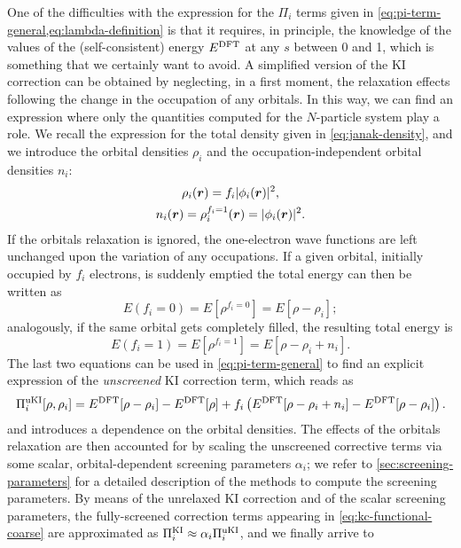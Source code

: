 One of the difficulties with the expression for the $\Pi_i$ terms given in \cref{eq:pi-term-general,eq:lambda-definition} is that it requires, in principle, the knowledge of the values of the (self-consistent) energy $E^{\rm DFT}$ at any $s$ between 0 and 1, which is something that we certainly want to avoid. A simplified version of the KI correction can be obtained by neglecting, in a first moment, the relaxation effects following the change in the occupation of any orbitals. In this way, we can find an expression where only the quantities computed for the $N$-particle system play a role. We recall the expression for the total density given in \cref{eq:janak-density}, and we introduce the orbital densities $\rho_i$ and the occupation-independent orbital densities $n_i$:
%
\begin{equation}
    \begin{gathered}
    \rho_i({\bm r}) = f_i |\phi_i({\bm r})|^2 , \\
    n_i({\bm r}) = \rho_i^{f_i=1}({\bm r}) = |\phi_i({\bm r})|^2 .
    \end{gathered}
    \label{eq:orbital-densities}
\end{equation}
%
If the orbitals relaxation is ignored, the one-electron wave functions are left unchanged upon the variation of any occupations. If a given orbital, initially occupied by $f_i$ electrons, is suddenly emptied the total energy can then be written as
%
\begin{equation}
    E(f_i=0) = E[\rho^{f_i=0}] = E[\rho-\rho_i] ;
    \label{eq:unrelaxed-energy-emptied-orbital}
\end{equation}
%
analogously, if the same orbital gets completely filled, the resulting total energy is
%
\begin{equation}
    E(f_i=1) = E[\rho^{f_i=1}] = E[\rho-\rho_i+n_i] .
    \label{eq:unrelaxed-energy-filled-orbital}
\end{equation}
%
The last two equations can be used in \cref{eq:pi-term-general} to find an explicit expression of the \emph{unscreened} KI correction term, which reads as
%
\begin{equation}
    \Pi_i^{\rm uKI}[\rho,\rho_i] = E^{\rm DFT}[\rho - \rho_i] - E^{\rm DFT}[\rho] + f_i \left( E^{\rm DFT}[\rho - \rho_i + n_i] - E^{\rm DFT}[\rho - \rho_i] \right) .
    \label{eq:ki-correction}
\end{equation}
%
and introduces a dependence on the orbital densities. The effects of the orbitals relaxation are then accounted for by scaling the unscreened corrective terms via some scalar, orbital-dependent screening parameters $\alpha_i$; we refer to \cref{sec:screening-parameters} for a detailed description of the methods to compute the screening parameters. By means of the unrelaxed KI correction and of the scalar screening parameters, the fully-screened correction terms appearing in \cref{eq:kc-functional-coarse} are approximated as $\Pi_i^{\rm KI} \approx \alpha_i \Pi_i^{\rm uKI}$, and we finally arrive to \cite{borghi_koopmans-compliant_2014}
